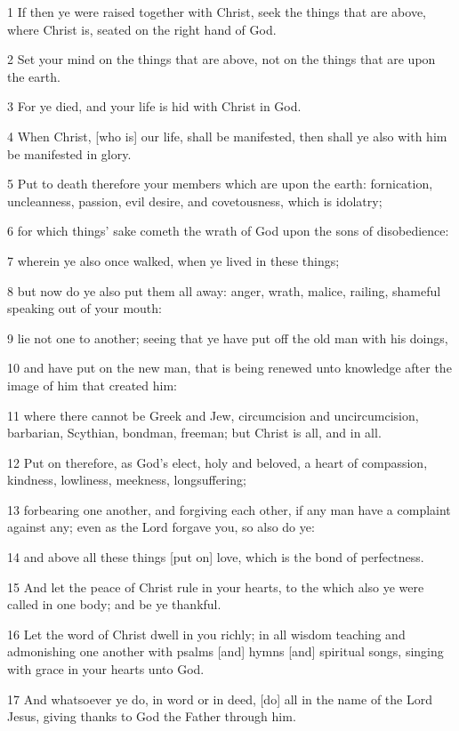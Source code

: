 \par 1 If then ye were raised together with Christ, seek the things that are above, where Christ is, seated on the right hand of God.
\par 2 Set your mind on the things that are above, not on the things that are upon the earth.
\par 3 For ye died, and your life is hid with Christ in God.
\par 4 When Christ, [who is] our life, shall be manifested, then shall ye also with him be manifested in glory.
\par 5 Put to death therefore your members which are upon the earth: fornication, uncleanness, passion, evil desire, and covetousness, which is idolatry;
\par 6 for which things' sake cometh the wrath of God upon the sons of disobedience:
\par 7 wherein ye also once walked, when ye lived in these things;
\par 8 but now do ye also put them all away: anger, wrath, malice, railing, shameful speaking out of your mouth:
\par 9 lie not one to another; seeing that ye have put off the old man with his doings,
\par 10 and have put on the new man, that is being renewed unto knowledge after the image of him that created him:
\par 11 where there cannot be Greek and Jew, circumcision and uncircumcision, barbarian, Scythian, bondman, freeman; but Christ is all, and in all.
\par 12 Put on therefore, as God's elect, holy and beloved, a heart of compassion, kindness, lowliness, meekness, longsuffering;
\par 13 forbearing one another, and forgiving each other, if any man have a complaint against any; even as the Lord forgave you, so also do ye:
\par 14 and above all these things [put on] love, which is the bond of perfectness.
\par 15 And let the peace of Christ rule in your hearts, to the which also ye were called in one body; and be ye thankful.
\par 16 Let the word of Christ dwell in you richly; in all wisdom teaching and admonishing one another with psalms [and] hymns [and] spiritual songs, singing with grace in your hearts unto God.
\par 17 And whatsoever ye do, in word or in deed, [do] all in the name of the Lord Jesus, giving thanks to God the Father through him.
